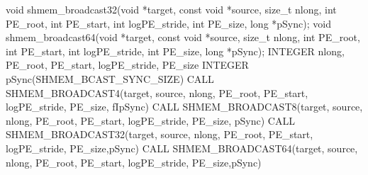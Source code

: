 \synC   %
void shmem_broadcast32(void *target, const void *source, size_t nlong, int PE_root, int PE_start, int logPE_stride, int PE_size, long *pSync);
void shmem_broadcast64(void *target, const void *source, size_t nlong, int PE_root, int PE_start, int logPE_stride, int PE_size, long *pSync);
\synF   %
INTEGER nlong, PE_root, PE_start, logPE_stride, PE_size
INTEGER pSync(SHMEM_BCAST_SYNC_SIZE)
CALL SHMEM_BROADCAST4(target, source, nlong, PE_root, PE_start, logPE_stride, PE_size, fIpSync)
CALL SHMEM_BROADCAST8(target, source, nlong, PE_root, PE_start, logPE_stride, PE_size, pSync)
CALL SHMEM_BROADCAST32(target, source, nlong, PE_root, PE_start, logPE_stride, PE_size,pSync)
CALL SHMEM_BROADCAST64(target, source, nlong, PE_root, PE_start, logPE_stride, PE_size,pSync)

